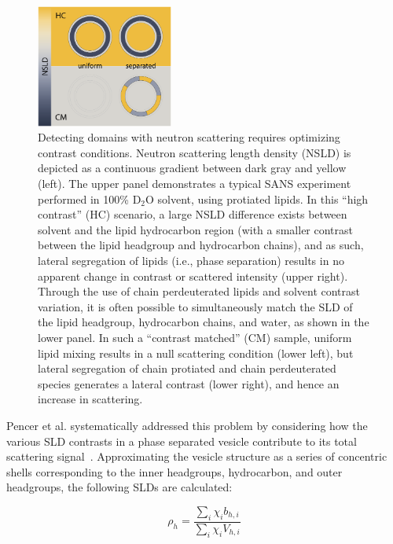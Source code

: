 \documentclass[8.5pt,twoside,twocolumn]{article}
\begin{document}
\begin{figure} [t]
	\centering
	\includegraphics[width=0.4\textwidth]{figures/figure_1_contrast_schematic.eps}
	\caption{Detecting domains with neutron scattering requires optimizing contrast conditions. Neutron scattering length density (NSLD) is depicted as a continuous gradient between dark gray and yellow (left). The upper panel demonstrates a typical SANS experiment performed in 100\% D$_2$O solvent, using protiated lipids. In this ``high contrast'' (HC) scenario, a large NSLD difference exists between solvent and the lipid hydrocarbon region (with a smaller contrast between the lipid headgroup and hydrocarbon chains), and as such, lateral segregation of lipids (i.e., phase separation) results in no apparent change in contrast or scattered intensity (upper right). Through the use of chain perdeuterated lipids and solvent contrast variation, it is often possible to simultaneously match the SLD of the lipid headgroup, hydrocarbon chains, and water, as shown in the lower panel. In such a ``contrast matched'' (CM) sample, uniform lipid mixing results in a null scattering condition (lower left), but lateral segregation of chain protiated and chain perdeuterated species generates a lateral contrast (lower right), and hence an increase in scattering.}
	\label{fig:SANS_domains}
	
\end{figure}

Pencer et al. systematically addressed this problem by considering how the various SLD contrasts in a phase separated vesicle contribute to its total scattering signal~\cite{Pencer.2006}. Approximating the vesicle structure as a series of concentric shells corresponding to the inner headgroups, hydrocarbon, and outer headgroups, the following SLDs are calculated:


\begin{equation}
\label{eq.Fred1}
	\rho_h= \frac{\sum_{i} \chi_i b_{h,i}}{\sum_{i}\chi_i V_{h,i}}
\end{equation}
\end{document}
